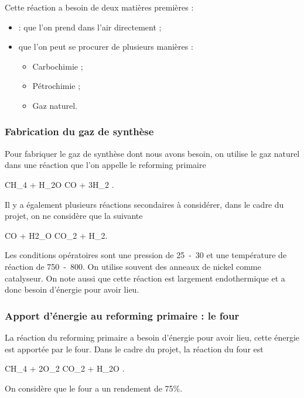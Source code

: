 Cette réaction a besoin de deux matières
premières :
\begin{itemize}
	\item {} : que l'on prend dans l'air
	directement ;
	\item {} que l'on peut se procurer
	de plusieurs manières :
	\begin{itemize}
		\item Carbochimie ;
		\item Pétrochimie ;
		\item Gaz naturel.
	\end{itemize}
\end{itemize}

\subsubsection{Fabrication du gaz de synthèse}
Pour fabriquer le gaz de synthèse 
dont nous avons besoin, on utilise le gaz naturel
 dans une réaction que l'on appelle
le reforming primaire 
\begin{chemmath}
	CH_4 + H_2O \Leftrightarrow CO + 3H_2 .
\end{chemmath}
Il y a également plusieurs réactions secondaires à
considérer, dans le cadre du projet, on ne considère
que la suivante
\begin{chemmath}
	CO + H2_O \Leftrightarrow CO_2 + H_2.
\end{chemmath}
Les conditions opératoires sont une pression
de \unit{25-30}{\bbar} et une température
de réaction de \unit{750-800}{\degreecelsius}.
On utilise souvent des anneaux de nickel comme
catalyseur.
On note aussi que cette réaction est largement
endothermique et a donc besoin d'énergie pour avoir
lieu.

\subsubsection{Apport d'énergie au reforming primaire : le four}
La réaction du reforming primaire a besoin
d'énergie pour avoir lieu, cette énergie est apportée
par le four. Dans le cadre du projet, la réaction
du four est
\begin{chemmath}
	CH_4 + 2O_2 \rightarrow CO_2 + H_2O .
\end{chemmath}
On considère que le four a un rendement de 75\%.

